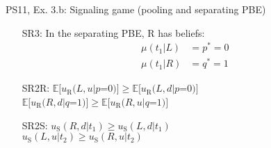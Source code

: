 \begin{frame}{PS11, Ex. 3.b: Signaling game (pooling and separating PBE)}
\begin{multicols}{2}
      \begin{itemize}
        \item[SR3:] In the separating PBE, R has beliefs:\vspace{-10pt}
        \begin{align*}
          \mu(t_1|L)&=p^*=0&\\
          \mu(t_1|R)&=q^*=1
        \end{align*}
        \item[SR2R:] \vspace{-6pt}
                     $\mathbb{E}[u_\text{R}(L,u|p$=$0)]\geq\mathbb{E}[u_\text{R}(L,d|p$=$0)]$\\
                     $\mathbb{E}[u_\text{R}(R,d|q$=$1)]\geq \mathbb{E}[u_\text{R}(R,u|q$=$1)]$
        \item[SR2S:] $u_\text{S}(R,d|t_1)\geq u_\text{S}(L,d|t_1)$\\
                     $u_\text{S}(L,u|t_2)\geq u_\text{S}(R,u|t_2)$
      \end{itemize}
      \vfill\null \columnbreak
      \vfill
    \end{multicols}
\end{frame}
